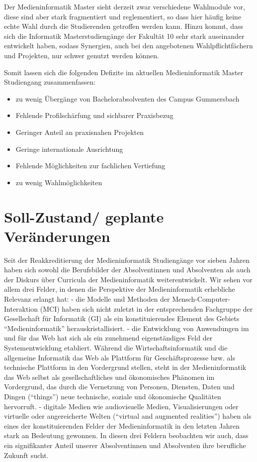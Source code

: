 Der Medieninformatik Master sieht derzeit zwar verschiedene Wahlmodule
vor, diese sind aber stark fragmentiert und reglementiert, so dass hier
häufig keine echte Wahl durch die Studierenden getroffen werden kann.
Hinzu kommt, dass sich die Informatik Masterstudiengänge der Fakultät 10
sehr stark auseinander entwickelt haben, sodass Synergien, auch bei den
angebotenen Wahlpflichtfächern und Projekten, nur schwer genutzt werden
können.

Somit lassen sich die folgenden Defizite im aktuellen Medieninformatik
Master Studiengang zusammenfassen:

\begin{itemize}
\tightlist
\item
  zu wenig Übergänge von Bachelorabsolventen des Campus Gummersbach
\item
  Fehlende Profilschärfung und sichbarer Praxisbezug
\item
  Geringer Anteil an praxisnahen Projekten
\item
  Geringe internationale Ausrichtung
\item
  Fehlende Möglichkeiten zur fachlichen Vertiefung
\item
  zu wenig Wahlmöglichkeiten
\end{itemize}

\chapter{Soll-Zustand/ geplante
Veränderungen}\label{soll-zustand-geplante-veruxe4nderungen}

Seit der Reakkreditierung der Medieninformatik Studiengänge vor sieben
Jahren haben sich sowohl die Berufsbilder der Absolventinnen und
Absolventen als auch der Diskurs über Curricula der Medieninformatik
weiterentwickelt. Wir sehen vor allem drei Felder, in denen die
Perspektive der Medieninformatik erhebliche Relevanz erlangt hat: - die
Modelle und Methoden der Mensch-Computer-Interaktion (MCI) haben sich
nicht zuletzt in der entsprechenden Fachgruppe der Gesellschaft für
Informatik (GI) als ein konstituierendes Element des Gebiets
``Medieninformatik'' herauskristallisiert. - die Entwicklung von
Anwendungen im und für das Web hat sich als ein zunehmend eigenständiges
Feld der Systementwicklung etabliert. Während die Wirtschaftsinformatik
und die allgemeine Informatik das Web als Plattform für
Geschäftsprozesse bzw. als technische Plattform in den Vordergrund
stellen, steht in der Medieninformatik das Web selbst als
gesellschaftliches und ökonomisches Phänomen im Vordergrund, das durch
die Vernetzung von Personen, Diensten, Daten und Dingen (``things'')
neue technische, soziale und ökonomische Qualitäten hervorruft. -
digitale Medien wie audiovisuelle Medien, Visualisierungen oder
virtuelle oder angereicherte Welten (``virtual and augmented
realities'') haben als eines der konstituierenden Felder der
Medieninformatik in den letzten Jahren stark an Bedeutung gewonnen. In
diesen drei Feldern beobachten wir auch, dass ein signifikanter Anteil
unserer Absolventinnen und Absolventen ihre berufliche Zukunft sucht.

